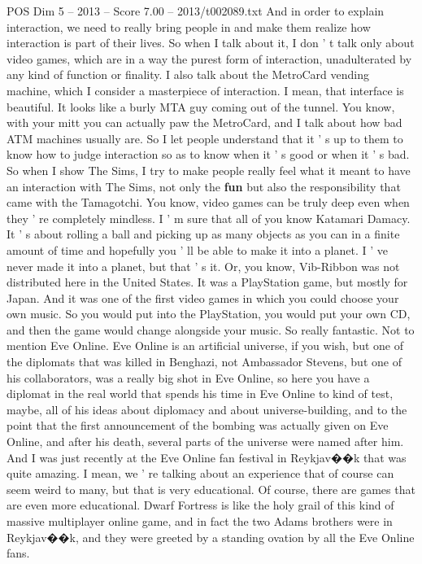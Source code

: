 \begin{textsample}{POS Dim 5 – 2013 – Score 7.00 – 2013/t002089.txt}
And in order to explain interaction, we need to really bring people in and make them realize how interaction is part of their lives.
So when I talk about it, I don ' t talk only about video games, which are in a way the purest form of interaction, unadulterated by any kind of function or finality.
I also talk about the MetroCard vending machine, which I consider a masterpiece of interaction.
I mean, that interface is beautiful.
It looks like a burly MTA guy coming out of the tunnel.
You know, with your mitt you can actually paw the MetroCard, and I talk about how bad ATM machines usually are.
So I let people understand that it ' s up to them to know how to judge interaction so as to know when it ' s good or when it ' s bad.
So when I show The Sims, I try to make people really feel what it meant to have an interaction with The Sims, not only the \textbf{fun} but also the responsibility that came with the Tamagotchi.
You know, video games can be truly deep even when they ' re completely mindless.
I ' m sure that all of you know Katamari Damacy.
It ' s about rolling a ball and picking up as many objects as you can in a finite amount of time and hopefully you ' ll be able to make it into a planet.
I ' ve never made it into a planet, but that ' s it.
Or, you know, Vib-Ribbon was not distributed here in the United States.
It was a PlayStation game, but mostly for Japan.
And it was one of the first video games in which you could choose your own music.
So you would put into the PlayStation, you would put your own CD, and then the game would change alongside your music.
So really fantastic.
Not to mention Eve Online.
Eve Online is an artificial universe, if you wish, but one of the diplomats that was killed in Benghazi, not Ambassador Stevens, but one of his collaborators, was a really big shot in Eve Online, so here you have a diplomat in the real world that spends his time in Eve Online to kind of test, maybe, all of his ideas about diplomacy and about universe-building, and to the point that the first announcement of the bombing was actually given on Eve Online, and after his death, several parts of the universe were named after him.
And I was just recently at the Eve Online fan festival in Reykjav{\EmojiFont �}{\EmojiFont �}k that was quite amazing.
I mean, we ' re talking about an experience that of course can seem weird to many, but that is very educational.
Of course, there are games that are even more educational.
Dwarf Fortress is like the holy grail of this kind of massive multiplayer online game, and in fact the two Adams brothers were in Reykjav{\EmojiFont �}{\EmojiFont �}k, and they were greeted by a standing ovation by all the Eve Online fans.

\end{textsample}
